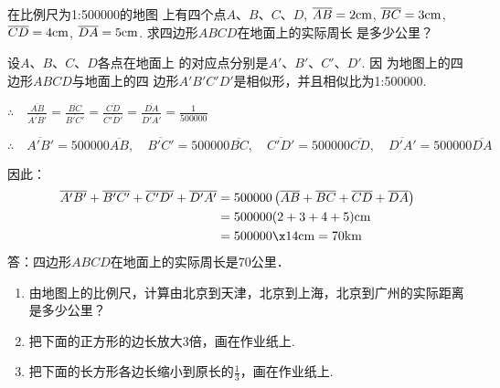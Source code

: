 \begin{example}
	在比例尺为1:500000的地图
上有四个点$A$、$B$、$C$、$D$, $\overline{AB}=2{\rm cm}$,
$\overline{BC}=3{\rm cm}$, $\overline{CD}=4{\rm cm}$, $\overline{DA}=5{\rm cm}$. 
求四边形$ABCD$在地面上的实际周长
是多少公里？
\end{example}

\begin{figure}[htp]
	\centering
{}
	\caption{}
\end{figure}

\begin{solution}
	设$A$、$B$、$C$、$D$各点在地面上
的对应点分别是$A'$、$B'$、$C'$、$D'$. 因
为地图上的四边形$ABCD$与地面上的四
边形$A'B'C'D'$是相似形，并且相似比为1:500000.

$\therefore\quad \frac{\overline{AB}}{\overline{A'B'}}=\frac{\overline{BC}}{\overline{B'C'}}=\frac{\overline{CD}}{\overline{C'D'}}=\frac{\overline{DA}}{\overline{D'A'}}=\frac{1}{500000}$

$\therefore\quad \overline{A'B'}=500000\overline{AB},\quad \overline{B'C'}=500000\overline{BC},\quad \overline{C'D'}=500000\overline{CD},\quad \overline{D'A'}=500000\overline{DA}$

因此：
\[\begin{split}
	\overline{A'B'}+\overline{B'C'}+\overline{C'D'}+\overline{D'A'}&=500000\left(\overline{AB}+\overline{BC}+\overline{CD}+\overline{DA}\right)\\
	&=500000(2+3+4+5) {\rm cm}\\
	&=500000\x 14{\rm cm}=70{\rm km}
\end{split}\]
答：四边形$ABCD$在地面上的实际周长是70公里．
\end{solution}

\begin{ex}
\begin{enumerate}
	\item 由地图上的比例尺，计算由北京到天津，北京到上海，北京到广州的实际距离是多少公里？
	\item 把下面的正方形的边长放大3倍，画在作业纸上.
	\item 把下面的长方形各边长缩小到原长的$\frac{1}{3}$，画在作业纸上.
\end{enumerate}
\end{ex}

